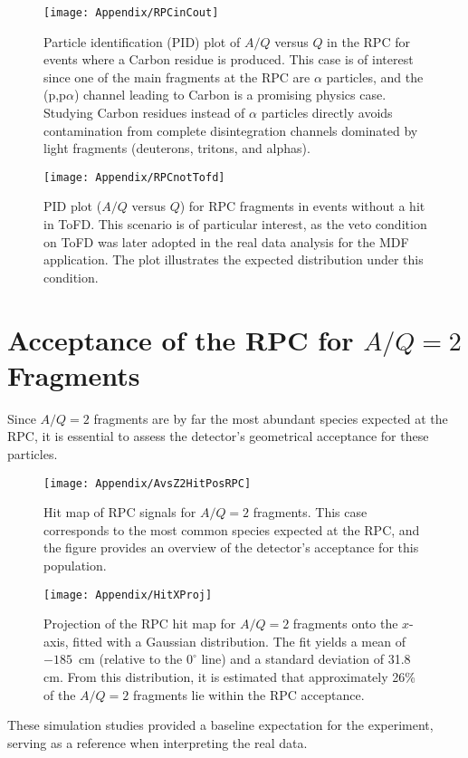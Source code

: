 \begin{figure}[htbp]
	\centering
	\texttt{[image: Appendix/RPCinCout]}
	\caption[PID of RPC fragments in events with Carbon residues]{Particle identification (PID) plot of $A/Q$ versus $Q$ in the \gls{RPC} for events where a Carbon residue is produced. This case is of interest since one of the main fragments at the \gls{RPC} are $\alpha$ particles, and the (p,p$\alpha$) channel leading to Carbon is a promising physics case. Studying Carbon residues instead of $\alpha$ particles directly avoids contamination from complete disintegration channels dominated by light fragments (deuterons, tritons, and alphas).}
	\label{fig:pid_carbon}
\end{figure}

\begin{figure}[htbp]
	\centering
	\texttt{[image: Appendix/RPCnotTofd]}
	\caption[PID of RPC fragments with no ToFD hits]{PID plot ($A/Q$ versus $Q$) for \gls{RPC} fragments in events without a hit in \gls{ToFD}. This scenario is of particular interest, as the veto condition on \gls{ToFD} was later adopted in the real data analysis for the \gls{MDF} application. The plot illustrates the expected distribution under this condition.}
	\label{fig:pid_noToFD}
\end{figure}

\section{Acceptance of the RPC for $A/Q=2$ Fragments}

Since $A/Q=2$ fragments are by far the most abundant species expected at the \gls{RPC}, it is essential to assess the detector’s geometrical acceptance for these particles.  

\begin{figure}[htbp]
	\centering
	\texttt{[image: Appendix/AvsZ2HitPosRPC]}
	\caption[RPC hit map for $A/Q=2$ fragments]{Hit map of \gls{RPC} signals for $A/Q=2$ fragments. This case corresponds to the most common species expected at the \gls{RPC}, and the figure provides an overview of the detector’s acceptance for this population.}
	\label{fig:rpc_hitmap_aq2}
\end{figure}

\begin{figure}[htbp]
	\centering
	\texttt{[image: Appendix/HitXProj]}
	\caption[X projection of RPC hit map for $A/Q=2$ fragments]{Projection of the \gls{RPC} hit map for $A/Q=2$ fragments onto the $x$-axis, fitted with a Gaussian distribution. The fit yields a mean of $-185$~cm (relative to the $0^\circ$ line) and a standard deviation of 31.8 cm. From this distribution, it is estimated that approximately 26\% of the $A/Q=2$ fragments lie within the \gls{RPC} acceptance.}
	\label{fig:rpc_hitmap_xproj}
\end{figure}

These simulation studies provided a baseline expectation for the experiment, serving as a reference when interpreting the real data.
